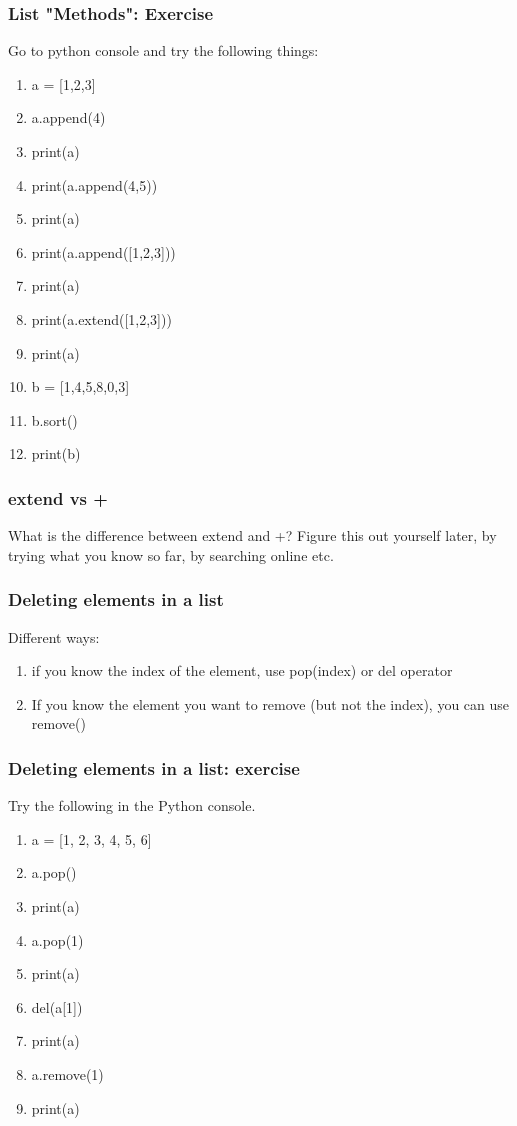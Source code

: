 \documentclass{beamer}
\begin{document}
\begin{frame}[fragile]
\frametitle{List "Methods": Exercise}
Go to python console and try the following things:
\begin{enumerate}
\item a = [1,2,3]
\item a.append(4)
\item print(a)
\item print(a.append(4,5))
\item print(a)
\item print(a.append([1,2,3]))
\item print(a)
\item print(a.extend([1,2,3]))
\item print(a)
\item b = [1,4,5,8,0,3]
\item b.sort()
\item print(b)
\end{enumerate}
\end{frame}

\begin{frame}
\frametitle{extend vs +}
What is the difference between extend and +? Figure this out yourself later, by trying what you know so far, by searching online etc. 
\end{frame}

\begin{frame}[fragile]
\frametitle{Deleting elements in a list}
Different ways:
\begin{enumerate}
\item if you know the index of the element, use pop(index) or del operator
\item If you know the element you want to remove (but not the index), you can use remove() 
\end{enumerate}
\end{frame}

\begin{frame}
\frametitle{Deleting elements in a list: exercise}
Try the following in the Python console.
\begin{enumerate}
\item a = [1, 2, 3, 4, 5, 6]
\item a.pop()
\item print(a)
\item a.pop(1)
\item print(a)
\item del(a[1])
\item print(a)
\item a.remove(1)
\item print(a)
\end{enumerate}
\end{frame}
\end{document}
